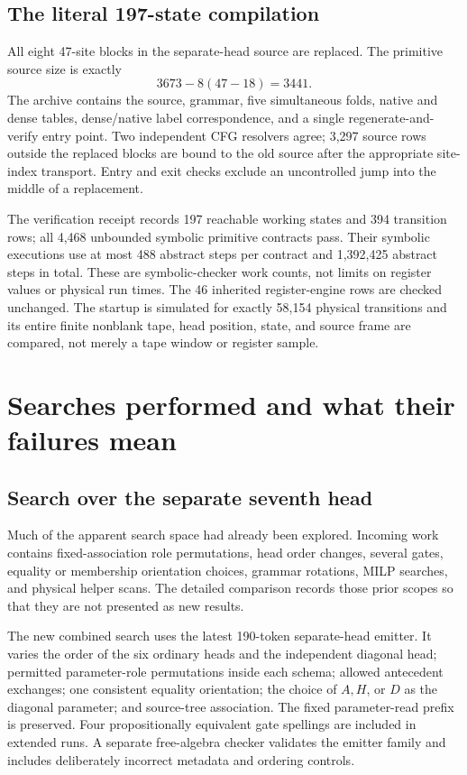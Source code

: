 \documentclass[11pt,a4paper]{article}
\begin{document}
\subsection{The literal 197-state compilation}

All eight 47-site blocks in the separate-head source are replaced. The
primitive source size is exactly
\[
 3673-8(47-18)=3441.
\]
The archive contains the source, grammar, five simultaneous folds, native
and dense tables, dense/native label correspondence, and a single
regenerate-and-verify entry point. Two independent CFG resolvers agree;
3,297 source rows outside the replaced blocks are bound to the old source
after the appropriate site-index transport. Entry and exit checks exclude
an uncontrolled jump into the middle of a replacement.

The verification receipt records 197 reachable working states and 394
transition rows; all 4,468 unbounded symbolic primitive contracts pass.
Their symbolic executions use at most 488 abstract steps per contract and
1,392,425 abstract steps in total. These are symbolic-checker work counts,
not limits on register values or physical run times. The 46 inherited
register-engine rows are checked unchanged. The startup is simulated for
exactly 58,154 physical transitions and its entire finite nonblank tape,
head position, state, and source frame are compared, not merely a tape
window or register sample.

\section{Searches performed and what their failures mean}

\subsection{Search over the separate seventh head}

Much of the apparent search space had already been explored. Incoming
work contains fixed-association role permutations, head order changes,
several gates, equality or membership orientation choices, grammar
rotations, MILP searches, and physical helper scans. The detailed comparison
records those prior scopes so that they are not presented as new results.

The new combined search uses the latest 190-token separate-head emitter.
It varies the order of the six ordinary heads and the independent diagonal
head; permitted parameter-role permutations inside each schema; allowed
antecedent exchanges; one consistent equality orientation; the choice of
$A,H$, or $D$ as the diagonal parameter; and source-tree association.
The fixed parameter-read prefix is preserved. Four propositionally
equivalent gate spellings are included in extended runs. A separate
free-algebra checker validates the emitter family and includes deliberately
incorrect metadata and ordering controls.
\end{document}
